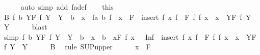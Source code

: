\begin{isabellebody}
\ \ \ \ \isamarkupfalse%
\ {\isacharparenleft}{\kern0pt}auto\ simp\ add{\isacharcolon}{\kern0pt}\ fa{\isacharunderscore}{\kern0pt}def{\isacharparenright}{\kern0pt}\isanewline
\ \ \isamarkupfalse%
\ this\ \isamarkupfalse%
\ B{\isacharcolon}{\kern0pt}\ {\isachardoublequoteopen}{\isasymAnd}f\ b{\isachardot}{\kern0pt}\ {\isasymforall}Y{\isasymin}F{\isachardot}{\kern0pt}\ f\ Y\ {\isasymin}\ Y\ {\isasymLongrightarrow}\ b\ {\isasymin}\ x\ {\isasymLongrightarrow}\ fa\ b\ f\ {\isacharbackquote}{\kern0pt}\ {\isacharparenleft}{\kern0pt}{\isacharbraceleft}{\kern0pt}x{\isacharbraceright}{\kern0pt}\ {\isasymunion}\ F{\isacharparenright}{\kern0pt}\ {\isasymin}\ {\isacharbraceleft}{\kern0pt}insert\ {\isacharparenleft}{\kern0pt}f\ x{\isacharparenright}{\kern0pt}\ {\isacharparenleft}{\kern0pt}f\ {\isacharbackquote}{\kern0pt}\ F{\isacharparenright}{\kern0pt}\ {\isacharbar}{\kern0pt}f{\isachardot}{\kern0pt}\ f\ x\ {\isasymin}\ x\ {\isasymand}\ {\isacharparenleft}{\kern0pt}{\isasymforall}Y{\isasymin}F{\isachardot}{\kern0pt}\ f\ Y\ {\isasymin}\ Y{\isacharparenright}{\kern0pt}{\isacharbraceright}{\kern0pt}{\isachardoublequoteclose}\isanewline
\ \ \ \ \isamarkupfalse%
\ blast\isanewline
\ \ \isamarkupfalse%
\ {\isacharbrackleft}{\kern0pt}simp{\isacharbrackright}{\kern0pt}{\isacharcolon}{\kern0pt}\ {\isachardoublequoteopen}{\isasymAnd}f\ b{\isachardot}{\kern0pt}\ {\isasymforall}Y{\isasymin}F{\isachardot}{\kern0pt}\ f\ Y\ {\isasymin}\ Y\ {\isasymLongrightarrow}\ b\ {\isasymin}\ x\ {\isasymLongrightarrow}\ b\ {\isasymsqinter}\ {\isacharparenleft}{\kern0pt}{\isasymSqinter}x{\isasymin}F{\isachardot}{\kern0pt}\ f\ x{\isacharparenright}{\kern0pt}\ \ {\isasymle}\ {\isasymSqunion}{\isacharparenleft}{\kern0pt}Inf\ {\isacharbackquote}{\kern0pt}\ {\isacharbraceleft}{\kern0pt}insert\ {\isacharparenleft}{\kern0pt}f\ x{\isacharparenright}{\kern0pt}\ {\isacharparenleft}{\kern0pt}f\ {\isacharbackquote}{\kern0pt}\ F{\isacharparenright}{\kern0pt}\ {\isacharbar}{\kern0pt}f{\isachardot}{\kern0pt}\ f\ x\ {\isasymin}\ x\ {\isasymand}\ {\isacharparenleft}{\kern0pt}{\isasymforall}Y{\isasymin}F{\isachardot}{\kern0pt}\ f\ Y\ {\isasymin}\ Y{\isacharparenright}{\kern0pt}{\isacharbraceright}{\kern0pt}{\isacharparenright}{\kern0pt}{\isachardoublequoteclose}\isanewline
\ \ \ \ \isamarkupfalse%
\ B\ \isamarkupfalse%
\ {\isacharparenleft}{\kern0pt}rule\ SUP{\isacharunderscore}{\kern0pt}upper{}{\isacharparenright}{\kern0pt}\isanewline
\ \ \ \ \isamarkupfalse%
\ {\isacartoucheopen}x\ {\isasymnotin}\ F{\isacartoucheclose}\ \isamarkupfalse%

\end{isabellebody}
